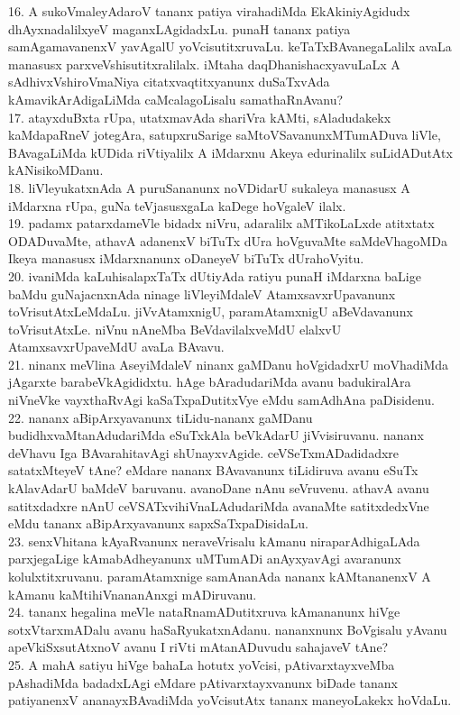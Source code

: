 \documentclass{article}
\begin{document}
16. A sukoVmaleyAdaroV tananx patiya virahadiMda EkAkiniyAgidudx dhAyxnadalilxyeV maganxLAgidadxLu. punaH tananx patiya samAgamavanenxV yavAgalU yoVcisutitxruvaLu. keTaTxBAvanegaLalilx avaLa manasusx parxveVshisutitxralilalx. iMtaha daqDhanishacxyavuLaLx A sAdhivxVshiroVmaNiya citatxvaqtitxyanunx duSaTxvAda kAmavikArAdigaLiMda caMcalagoLisalu samathaRnAvanu?\\
17. atayxduBxta rUpa, utatxmavAda shariVra kAMti, sAladudakekx kaMdapaRneV jotegAra, satupxruSarige saMtoVSavanunxMTumADuva liVle, BAvagaLiMda kUDida riVtiyalilx A iMdarxnu Akeya edurinalilx suLidADutAtx kANisikoMDanu.\\
18. liVleyukatxnAda A puruSananunx noVDidarU sukaleya manasusx A iMdarxna rUpa, guNa teVjasusxgaLa kaDege hoVgaleV ilalx.\\
19. padamx patarxdameVle bidadx niVru, adaralilx aMTikoLaLxde atitxtatx ODADuvaMte, athavA adanenxV biTuTx dUra hoVguvaMte saMdeVhagoMDa Ikeya manasusx iMdarxnanunx oDaneyeV biTuTx dUrahoVyitu.\\
20. ivaniMda kaLuhisalapxTaTx dUtiyAda ratiyu punaH iMdarxna baLige baMdu guNajacnxnAda ninage liVleyiMdaleV AtamxsavxrUpavanunx toVrisutAtxLeMdaLu. jiVvAtamxnigU, paramAtamxnigU aBeVdavanunx toVrisutAtxLe. niVnu nAneMba BeVdavilalxveMdU elalxvU AtamxsavxrUpaveMdU avaLa BAvavu.\\
21. ninanx meVlina AseyiMdaleV ninanx gaMDanu hoVgidadxrU moVhadiMda jAgarxte barabeVkAgididxtu. hAge bAradudariMda avanu badukiralAra niVneVke vayxthaRvAgi kaSaTxpaDutitxVye eMdu samAdhAna paDisidenu.\\
22. nananx aBipArxyavanunx tiLidu-nananx gaMDanu budidhxvaMtanAdudariMda eSuTxkAla beVkAdarU jiVvisiruvanu. nananx deVhavu Iga BAvarahitavAgi shUnayxvAgide. ceVSeTxmADadidadxre satatxMteyeV tAne? eMdare nananx BAvavanunx tiLidiruva avanu eSuTx kAlavAdarU baMdeV baruvanu. avanoDane nAnu seVruvenu. athavA avanu satitxdadxre nAnU ceVSATxvihiVnaLAdudariMda avanaMte satitxdedxVne eMdu tananx aBipArxyavanunx sapxSaTxpaDisidaLu.\\
23. senxVhitana kAyaRvanunx neraveVrisalu kAmanu niraparAdhigaLAda parxjegaLige kAmabAdheyanunx uMTumADi anAyxyavAgi avaranunx kolulxtitxruvanu. paramAtamxnige samAnanAda nananx kAMtananenxV A kAmanu kaMtihiVnananAnxgi mADiruvanu.\\
24. tananx hegalina meVle nataRnamADutitxruva kAmananunx hiVge sotxVtarxmADalu avanu haSaRyukatxnAdanu. nananxnunx BoVgisalu yAvanu apeVkiSxsutAtxnoV avanu I riVti mAtanADuvudu sahajaveV tAne?\\
25. A mahA satiyu hiVge bahaLa hotutx yoVcisi, pAtivarxtayxveMba pAshadiMda badadxLAgi eMdare pAtivarxtayxvanunx biDade tananx patiyanenxV ananayxBAvadiMda yoVcisutAtx tananx maneyoLakekx hoVdaLu.\\
\end{document}
